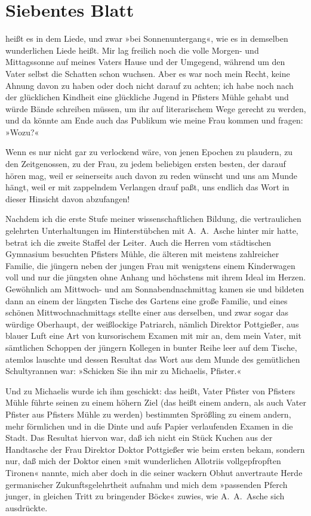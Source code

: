 \section{Siebentes Blatt}

heißt es in dem Liede, und zwar »bei Sonnenuntergang«, wie es in
demselben wunderlichen Liede heißt. Mir lag freilich noch die volle
Morgen- und Mittagssonne auf meines Vaters Hause und der Umgegend,
während um den Vater selbst die Schatten schon wuchsen. Aber es war
noch mein Recht, keine Ahnung davon zu haben oder doch nicht darauf
zu achten; ich habe noch nach der glücklichen Kindheit eine
glückliche Jugend in Pfisters Mühle gehabt und würde Bände
schreiben müssen, um ihr auf literarischem Wege gerecht zu werden,
und da könnte am Ende auch das Publikum wie meine Frau kommen und
fragen: »Wozu?«

Wenn es nur nicht gar zu verlockend wäre, von jenen Epochen zu
plaudern, zu den Zeitgenossen, zu der Frau, zu jedem beliebigen
ersten besten, der darauf hören mag, weil er seinerseits auch davon
zu reden wünscht und uns am Munde hängt, weil er mit zappelndem
Verlangen drauf paßt, uns endlich das Wort in dieser Hinsicht davon
abzufangen!

Nachdem ich die erste Stufe meiner wissenschaftlichen Bildung, die
vertraulichen gelehrten Unterhaltungen im Hinterstübchen mit
A.~A.~Asche hinter mir hatte, betrat ich die zweite Staffel der
Leiter. Auch die Herren vom städtischen Gymnasium besuchten
Pfisters Mühle, die älteren mit meistens zahlreicher Familie, die
jüngern neben der jungen Frau mit wenigstens einem Kinderwagen voll
und nur die jüngsten ohne Anhang und höchstens mit ihrem Ideal im
Herzen. Gewöhnlich am Mittwoch- und am Sonnabendnachmittag kamen
sie und bildeten dann an einem der längsten Tische des Gartens eine
große Familie, und eines schönen Mittwochnachmittags stellte einer
aus derselben, und zwar sogar das würdige Oberhaupt, der
weißlockige Patriarch, nämlich Direktor Pottgießer, aus blauer Luft
eine Art von kursorischem Examen mit mir an, dem mein Vater, mit
sämtlichen Schoppen der jüngern Kollegen in bunter Reihe leer auf
dem Tische, atemlos lauschte und dessen Resultat das Wort aus dem
Munde des gemütlichen Schultyrannen war: »Schicken Sie ihn mir zu
Michaelis, Pfister.«

Und zu Michaelis wurde ich ihm geschickt: das heißt, Vater Pfister
von Pfisters Mühle führte seinen zu einem höhern Ziel (das heißt
einem andern, als auch Vater Pfister aus Pfisters Mühle zu werden)
bestimmten Sprößling zu einem andern, mehr förmlichen und in die
Dinte und aufs Papier verlaufenden Examen in die Stadt. Das
Resultat hiervon war, daß ich nicht ein Stück Kuchen aus der
Handtasche der Frau Direktor Doktor Pottgießer wie beim ersten
bekam, sondern nur, daß mich der Doktor einen »mit wunderlichen
Allotriis vollgepfropften Tironen« nannte, mich aber doch in die
seiner wackern Obhut anvertraute Herde germanischer
Zukunftsgelehrtheit aufnahm und mich dem »passenden Pferch junger,
in gleichen Tritt zu bringender Böcke« zuwies, wie A.~A.~Asche sich
ausdrückte.

